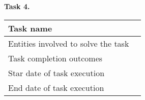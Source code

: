 \begin{description}
    \item \hspace*{8mm}\textbf{Task 4.}\\
    \begin{tabular}{|p{}|p{}|}
        \hline
        Task name                           & \\
        \hline
        Entities involved to solve the task & \\
        \hline
        Task completion outcomes            & \\
        \hline
        Star date of task execution         & \\
        \hline
        End date of task execution          & \\
        \hline
    \end{tabular}
\end{description}